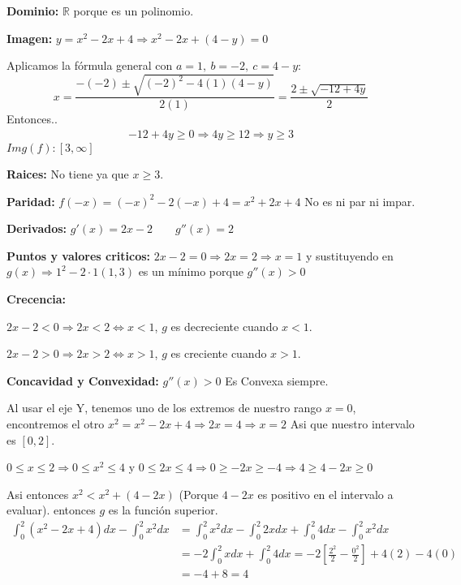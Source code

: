 \documentclass[12pt]{article}
\begin{document}
\begin{enumerate}[\hspace{9px} a)]
        \textbf{Dominio: }\(\mathbb{R}\) porque es un polinomio.\medskip

        \textbf{Imagen: } \(y = x^2-2x+4 \Longrightarrow x^2-2x+(4-y)=0\)\medskip

        Aplicamos la f\'ormula general con \(a=1, \ b=-2, \ c=4-y\):
        \begin{equation*}
            x=\frac{-(-2)\pm\sqrt{(-2)^2-4(1)(4-y)}}{2(1)} = \frac{2\pm\sqrt{-12+4y}}{2}
        \end{equation*}
        Entonces..
        \begin{align}
            -12+4y\geq0 \Longrightarrow 4y\geq12 \Longrightarrow y\geq3
        \end{align}
        \(Img(f): [3,\infty]\)\medskip

        \textbf{Raices: } No tiene ya que \(x\geq 3\).\medskip

        \textbf{Paridad: } \(f(-x)=(-x)^2-2(-x)+4=x^2+2x+4\) No es ni par ni impar.\medskip

        \textbf{Derivados: }\(g'(x)=2x-2 \qquad g''(x)=2\)\medskip

        \textbf{Puntos y valores criticos: } \(2x-2=0\Rightarrow 2x=2\Rightarrow x=1\) y sustituyendo en \(g(x)\Rightarrow 1^2-2\cdot1\)\((1,3)\) es un m\'inimo porque \(g''(x)>0\)\medskip

        \textbf{Crecencia: }\medskip
        
        \(2x-2<0\Rightarrow 2x<2\Leftrightarrow x<1\), $g$ es decreciente cuando \(x<1\).\medskip

        \(2x-2>0\Rightarrow 2x>2\Leftrightarrow x>1\), $g$ es creciente cuando \(x>1\).\medskip

        \textbf{Concavidad y Convexidad: }\(g''(x)>0\) Es Convexa siempre.\bigskip

        Al usar el eje Y, tenemos uno de los extremos de nuestro rango \(x=0\), encontremos el otro \(x^2 = x^2-2x+4\Rightarrow 2x=4\Rightarrow x=2\) Asi que nuestro intervalo es \([0,2]\).\medskip

        \(0\leq x\leq2 \Longrightarrow 0\leq x^2\leq 4\) y \(0\leq2x\leq4 \Longrightarrow 0\geq -2x\geq -4 \Longrightarrow 4\geq 4-2x\geq 0\)\medskip

        Asi entonces \(x^2<x^2+(4-2x)\) (Porque \(4-2x\) es positivo en el intervalo a evaluar). entonces \(g\) es la funci\'on superior.
        \begin{align*}
            \int_{0}^{2}(x^2-2x+4)dx-\int_{0}^{2}x^2dx &= \int_{0}^{2}x^2dx -\int_{0}^{2}2xdx +\int_{0}^{2}4dx -\int_{0}^{2}x^2dx \\
            &= -2\int_{0}^{2}xdx +\int_{0}^{2}4dx = -2\left[\frac{2^2}{2}-\frac{0^2}{2}\right]+4(2)-4(0)\\
            &= -4+8=4
        \end{align*}

\end{enumerate}
\end{document}

